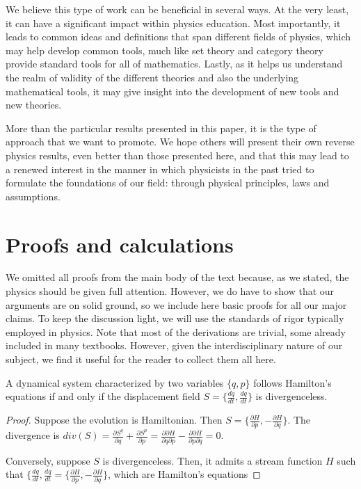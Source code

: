 \documentclass[10pt,twocolumn, nofootinbib]{revtex4-2}
\begin{document}
We believe this type of work can be beneficial in several ways. At the very least, it can have a significant impact within physics education. Most importantly, it leads to common ideas and definitions that span different fields of physics, which may help develop common tools, much like set theory and category theory provide standard tools for all of mathematics. Lastly, as it helps us understand the realm of validity of the different theories and also the underlying mathematical tools, it may give insight into the development of new tools and new theories.

More than the particular results presented in this paper, it is the type of approach that we want to promote. We hope others will present their own reverse physics results, even better than those presented here, and that this may lead to a renewed interest in the manner in which physicists in the past tried to formulate the foundations of our field: through physical principles, laws and assumptions.

\section{Proofs and calculations}

We omitted all proofs from the main body of the text because, as we stated, the physics should be given full attention. However, we do have to show that our arguments are on solid ground, so we include here basic proofs for all our major claims. To keep the discussion light, we will use the standards of rigor typically employed in physics. Note that most of the derivations are trivial, some already included in many textbooks. However, given the interdisciplinary nature of our subject, we find it useful for the reader to collect them all here.

\begin{prop}
	A dynamical system characterized by two variables $\{q, p\}$ follows Hamilton's equations if and only if the displacement field $S=\{\frac{dq}{dt}, \frac{dq}{dt} \}$ is divergenceless.
\end{prop}

\begin{proof}
	Suppose the evolution is Hamiltonian. Then $S=\{\frac{\partial H}{\partial p}, - \frac{\partial H}{\partial q} \}$. The divergence is $div(S) = \frac{\partial S^q}{\partial q} + \frac{\partial S^p}{\partial p} = \frac{\partial \partial H}{\partial q\partial p} - \frac{\partial \partial H}{\partial p\partial q} = 0$.
	
	Conversely, suppose $S$ is divergenceless. Then, it admits a stream function $H$ such that $\{\frac{dq}{dt}, \frac{dq}{dt} = \{\frac{\partial H}{\partial p}, - \frac{\partial H}{\partial q} \}$, which are Hamilton's equations
\end{proof}
\end{document}

